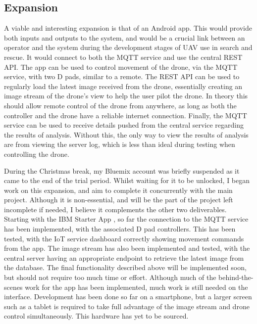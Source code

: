 \documentclass{article}
\begin{document}
\subsection{Expansion}
A viable and interesting expansion is that of an Android app. This would provide both inputs and outputs to the system, and would be a crucial link between an operator and the system during the development stages of UAV use in search and rescue. It would connect to both the MQTT service and use the central REST API. The app can be used to control movement of the drone, via the MQTT service, with two D pads, similar to a remote. The REST API can be used to regularly load the latest image received from the drone, essentially creating an image stream of the drone's view to help the user pilot the drone. In theory this should allow remote control of the drone from anywhere, as long as both the controller and the drone have a reliable internet connection. Finally, the MQTT service can be used to receive details pushed from the central service regarding the results of analysis. Without this, the only way to view the results of analysis are from viewing the server log, which is less than ideal during testing when controlling the drone.

\vspace{\baselineskip} \noindent
During the Christmas break, my Bluemix account was briefly suspended as it came to the end of the trial period. Whilst waiting for it to be unlocked, I began work on this expansion, and aim to complete it concurrently with the main project. Although it is non-essential, and will be the part of the project left incomplete if needed, I believe it complements the other two deliverables. Starting with the IBM Starter App \cite{IBMMessaging}, so far the connection to the MQTT service has been implemented, with the associated D pad controllers. This has been tested, with the IoT service dashboard correctly showing movement commands from the app. The image stream has also been implemented and tested, with the central server having an appropriate endpoint to retrieve the latest image from the database. The final functionality described above will be implemented soon, but should not require too much time or effort. Although much of the behind-the-scenes work for the app has been implemented, much work is still needed on the interface. Development has been done so far on a smartphone, but a larger screen such as a tablet is required to take full advantage of the image stream and drone control simultaneously. This hardware has yet to be sourced.
\end{document}
